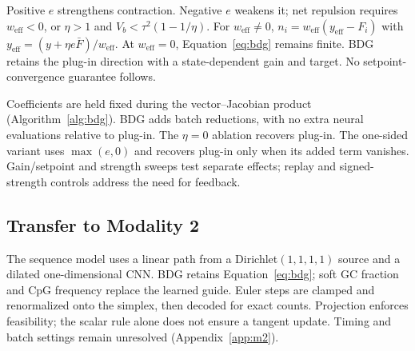 \documentclass{article}
\newcommand{\Fbar}{\bar F}
\newcommand{\Vb}{V_b}
\newcommand{\weff}{w_{\mathrm{eff}}}
\begin{document}
Positive $e$ strengthens contraction. Negative $e$ weakens it; net repulsion requires $\weff<0$, or $\eta>1$ and $\Vb<\tau^2(1-1/\eta)$. For $\weff\ne0$, $n_i=\weff(y_{\mathrm{eff}}-F_i)$ with $y_{\mathrm{eff}}=(y+\eta e\Fbar)/\weff$. At $\weff=0$, Equation~\eqref{eq:bdg} remains finite. BDG retains the plug-in direction with a state-dependent gain and target. No setpoint-convergence guarantee follows.

Coefficients are held fixed during the vector--Jacobian product (Algorithm~\ref{alg:bdg}). BDG adds batch reductions, with no extra neural evaluations relative to plug-in. The $\eta=0$ ablation recovers plug-in. The one-sided variant uses $\max(e,0)$ and recovers plug-in only when its added term vanishes. Gain/setpoint and strength sweeps test separate effects; replay and signed-strength controls address the need for feedback.

\subsection{Transfer to Modality 2}\label{sec:transfer}
The sequence model uses a linear path from a Dirichlet$(1,1,1,1)$ source and a dilated one-dimensional CNN. BDG retains Equation~\eqref{eq:bdg}; soft GC fraction and CpG frequency replace the learned guide. Euler steps are clamped and renormalized onto the simplex, then decoded for exact counts. Projection enforces feasibility; the scalar rule alone does not ensure a tangent update. Timing and batch settings remain unresolved (Appendix~\ref{app:m2}).
\end{document}
